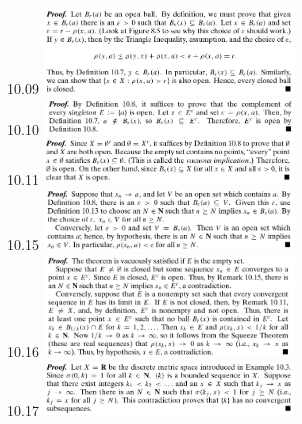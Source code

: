\documentclass[3pt,landscape]{article}
\begin{document}
\begin{multicols}{3}
    10.09
    \includegraphics[width=250]{10_09.png} \\
    10.10
    \includegraphics[width=250]{10_10.png} \\
    10.11
    \includegraphics[width=250]{10_11.png} \\
    10.15
    \includegraphics[width=250]{10_15.png} \\
    10.16
    \includegraphics[width=250]{10_16.png} \\
    10.17
    \includegraphics[width=250]{10_17.png} \\

\end{multicols}
\end{document}
